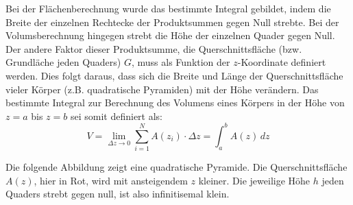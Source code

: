Bei der Fl\"{a}chenberechnung wurde das bestimmte Integral gebildet, indem die Breite der einzelnen Rechtecke der Produktsummen gegen Null strebte. Bei der Volumsberechnung hingegen strebt die H\"{o}he der einzelnen Quader gegen Null. Der andere Faktor dieser Produktsumme, die Querschnittsfl\"{a}che (bzw. Grundl\"{a}che jeden Quaders) $G$, muss als Funktion der $z$-Koordinate definiert werden. Dies folgt daraus, dass sich die Breite und L\"{a}nge der Querschnittsfl\"{a}che vieler K\"{o}rper (z.B. quadratische Pyramiden) mit der H\"{o}he ver\"{a}ndern. Das bestimmte Integral zur Berechnung des Volumens eines K\"{o}rpers in der H\"{o}he von $z = a$ bis $z = b$ sei somit definiert als: $$V = \lim_{\Delta z \rightarrow 0} \sum_{i=1}^{N} A(z_i) \cdot \Delta z = \int_a^b A(z) \, dz$$

Die folgende Abbildung zeigt eine quadratische Pyramide. Die Querschnittsfl\"{a}che $A(z)$, hier in Rot, wird mit ansteigendem $z$ kleiner. Die jeweilige H\"{o}he $h$ jeden Quaders strebt gegen null, ist also infinitisemal klein.

\begin{figure}[h!]

	\centering


\end{figure}

